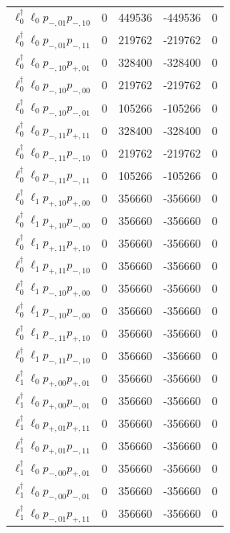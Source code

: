 \begin{longtable}{@{}lrrrr@{}}
$\ell_{0}^\dagger \ell_{0} p_{-,01} p_{-,10}$ & 0 & 449536 & -449536 & 0 \\
$\ell_{0}^\dagger \ell_{0} p_{-,01} p_{-,11}$ & 0 & 219762 & -219762 & 0 \\
$\ell_{0}^\dagger \ell_{0} p_{-,10} p_{+,01}$ & 0 & 328400 & -328400 & 0 \\
$\ell_{0}^\dagger \ell_{0} p_{-,10} p_{-,00}$ & 0 & 219762 & -219762 & 0 \\
$\ell_{0}^\dagger \ell_{0} p_{-,10} p_{-,01}$ & 0 & 105266 & -105266 & 0 \\
$\ell_{0}^\dagger \ell_{0} p_{-,11} p_{+,11}$ & 0 & 328400 & -328400 & 0 \\
$\ell_{0}^\dagger \ell_{0} p_{-,11} p_{-,10}$ & 0 & 219762 & -219762 & 0 \\
$\ell_{0}^\dagger \ell_{0} p_{-,11} p_{-,11}$ & 0 & 105266 & -105266 & 0 \\
$\ell_{0}^\dagger \ell_{1} p_{+,10} p_{+,00}$ & 0 & 356660 & -356660 & 0 \\
$\ell_{0}^\dagger \ell_{1} p_{+,10} p_{-,00}$ & 0 & 356660 & -356660 & 0 \\
$\ell_{0}^\dagger \ell_{1} p_{+,11} p_{+,10}$ & 0 & 356660 & -356660 & 0 \\
$\ell_{0}^\dagger \ell_{1} p_{+,11} p_{-,10}$ & 0 & 356660 & -356660 & 0 \\
$\ell_{0}^\dagger \ell_{1} p_{-,10} p_{+,00}$ & 0 & 356660 & -356660 & 0 \\
$\ell_{0}^\dagger \ell_{1} p_{-,10} p_{-,00}$ & 0 & 356660 & -356660 & 0 \\
$\ell_{0}^\dagger \ell_{1} p_{-,11} p_{+,10}$ & 0 & 356660 & -356660 & 0 \\
$\ell_{0}^\dagger \ell_{1} p_{-,11} p_{-,10}$ & 0 & 356660 & -356660 & 0 \\
$\ell_{1}^\dagger \ell_{0} p_{+,00} p_{+,01}$ & 0 & 356660 & -356660 & 0 \\
$\ell_{1}^\dagger \ell_{0} p_{+,00} p_{-,01}$ & 0 & 356660 & -356660 & 0 \\
$\ell_{1}^\dagger \ell_{0} p_{+,01} p_{+,11}$ & 0 & 356660 & -356660 & 0 \\
$\ell_{1}^\dagger \ell_{0} p_{+,01} p_{-,11}$ & 0 & 356660 & -356660 & 0 \\
$\ell_{1}^\dagger \ell_{0} p_{-,00} p_{+,01}$ & 0 & 356660 & -356660 & 0 \\
$\ell_{1}^\dagger \ell_{0} p_{-,00} p_{-,01}$ & 0 & 356660 & -356660 & 0 \\
$\ell_{1}^\dagger \ell_{0} p_{-,01} p_{+,11}$ & 0 & 356660 & -356660 & 0 \\

\end{longtable}
